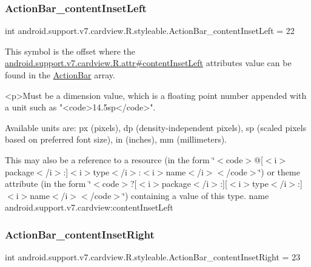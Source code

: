 \subsubsection{\texorpdfstring{Action\+Bar\+\_\+content\+Inset\+Left}{ActionBar\_contentInsetLeft}}
{\footnotesize\ttfamily int android.\+support.\+v7.\+cardview.\+R.\+styleable.\+Action\+Bar\+\_\+content\+Inset\+Left = 22\hspace{0.3cm}{\ttfamily [static]}}

This symbol is the offset where the \hyperlink{classandroid_1_1support_1_1v7_1_1cardview_1_1R_1_1attr_ac9a3713dc1e40a5608dcb7bf6b36f4a7}{android.\+support.\+v7.\+cardview.\+R.\+attr\#content\+Inset\+Left} attribute\textquotesingle{}s value can be found in the \hyperlink{classandroid_1_1support_1_1v7_1_1cardview_1_1R_1_1styleable_a0cbf7f776e31f78bb0a2b558daf176f8}{Action\+Bar} array.

\begin{DoxyVerb}      <p>Must be a dimension value, which is a floating point number appended with a unit such as "<code>14.5sp</code>".
\end{DoxyVerb}
 Available units are\+: px (pixels), dp (density-\/independent pixels), sp (scaled pixels based on preferred font size), in (inches), mm (millimeters). 

This may also be a reference to a resource (in the form \char`\"{}$<$code$>$@\mbox{[}$<$i$>$package$<$/i$>$\+:\mbox{]}$<$i$>$type$<$/i$>$\+:$<$i$>$name$<$/i$>$$<$/code$>$\char`\"{}) or theme attribute (in the form \char`\"{}$<$code$>$?\mbox{[}$<$i$>$package$<$/i$>$\+:\mbox{]}\mbox{[}$<$i$>$type$<$/i$>$\+:\mbox{]}$<$i$>$name$<$/i$>$$<$/code$>$\char`\"{}) containing a value of this type.  name android.\+support.\+v7.\+cardview\+:content\+Inset\+Left \mbox{\label{classandroid_1_1support_1_1v7_1_1cardview_1_1R_1_1styleable_aa43e0bb7411ac41bac49b12fad85a806}} 
\subsubsection{\texorpdfstring{Action\+Bar\+\_\+content\+Inset\+Right}{ActionBar\_contentInsetRight}}
{\footnotesize\ttfamily int android.\+support.\+v7.\+cardview.\+R.\+styleable.\+Action\+Bar\+\_\+content\+Inset\+Right = 23\hspace{0.3cm}{\ttfamily [static]}}

